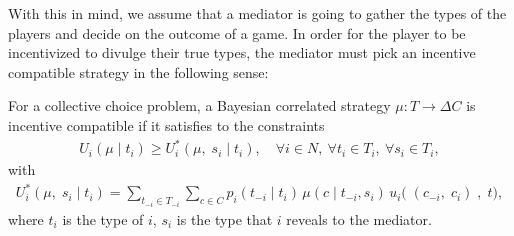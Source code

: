 With this in mind, we assume that a mediator is going to gather the types of the players and decide on the outcome of a game.
In order for the player to be incentivized to divulge their true types, the mediator must pick an incentive compatible strategy in the following sense:
\begin{definition}
For a collective choice problem, a Bayesian correlated strategy $\mu : T \rightarrow \Delta C$ is incentive compatible if it satisfies to the constraints
\begin{align*}
	U_i(\mu \; | \; t_i) \geq U_i^*(\mu,  \; s_i \; | \; t_i), \quad \forall i \in N, \ \forall t_i \in T_i, \ \forall s_i \in T_i,
\end{align*}
with
\begin{align*}
	U_i^*(\mu, \;  s_i \; | \; t_i) = \sum_{t_{-i} \in T_{-i}} \sum_{c \in C} p_i(t_{-i} \; | \; t_i) \, \mu(c \; | \; t_{-i}, s_i) \, u_i\big( \; (c_{-i}, \; c_i )\;, \; t \big),
\end{align*}
where $t_i$ is the type of $i$, $s_i$ is the type that $i$ reveals to the mediator.
\end{definition}
%
%
%
%
%
%
%
%


